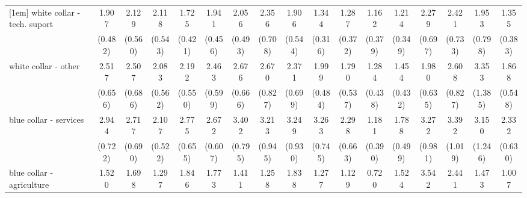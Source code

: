 {\begin{tabular}{l*{16}{c}}
[1em]
white collar - tech. suport&       1.907\sym{*}  &       2.129\sym{**} &       2.118\sym{**} &       1.725\sym{*}  &       1.941\sym{**} &       2.056\sym{**} &       2.356\sym{**} &       1.906\sym{*}  &       1.344         &       1.287         &       1.162         &       1.214         &       2.279\sym{**} &       2.421\sym{**} &       1.953         &       1.355         \\
                    &     (0.482)         &     (0.560)         &     (0.543)         &     (0.421)         &     (0.456)         &     (0.493)         &     (0.708)         &     (0.544)         &     (0.316)         &     (0.372)         &     (0.379)         &     (0.349)         &     (0.697)         &     (0.733)         &     (0.798)         &     (0.383)         \\
[1em]
white collar - other&       2.517\sym{***}&       2.507\sym{***}&       2.083\sym{**} &       2.192\sym{**} &       2.463\sym{***}&       2.676\sym{***}&       2.670\sym{**} &       2.371\sym{**} &       1.999\sym{**} &       1.790         &       1.284         &       1.454         &       1.980\sym{*}  &       2.608\sym{**} &       3.353\sym{**} &       1.868\sym{*}  \\
                    &     (0.656)         &     (0.686)         &     (0.562)         &     (0.550)         &     (0.599)         &     (0.666)         &     (0.827)         &     (0.699)         &     (0.484)         &     (0.537)         &     (0.438)         &     (0.432)         &     (0.635)         &     (0.827)         &     (1.385)         &     (0.548)         \\
[1em]
blue collar - services&       2.944\sym{***}&       2.717\sym{***}&       2.107\sym{**} &       2.775\sym{***}&       2.672\sym{***}&       3.402\sym{***}&       3.213\sym{***}&       3.249\sym{***}&       3.263\sym{***}&       2.298\sym{**} &       1.181         &       1.788\sym{*}  &       3.272\sym{***}&       3.392\sym{***}&       3.150\sym{**} &       2.332\sym{**} \\
                    &     (0.722)         &     (0.690)         &     (0.522)         &     (0.655)         &     (0.607)         &     (0.795)         &     (0.945)         &     (0.930)         &     (0.745)         &     (0.663)         &     (0.390)         &     (0.499)         &     (0.981)         &     (1.019)         &     (1.246)         &     (0.630)         \\
[1em]
blue collar - agriculture&       1.520         &       1.698         &       1.297         &       1.846\sym{*}  &       1.773\sym{*}  &       1.411         &       1.258         &       1.838         &       1.277         &       1.129         &       0.720         &       1.524         &       3.542\sym{***}&       2.441\sym{*}  &       1.473         &       1.007         \\

\end{tabular}}
